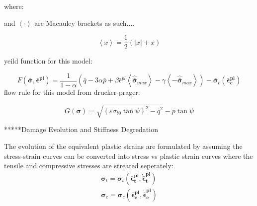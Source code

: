 where:



and $\left\langle \cdotp\right\rangle $ are Macauley brackets as
such....

\begin{equation}
\left\langle x\right\rangle =\frac{1}{2}\left(\left|x\right|+x\right)\label{eqn:const9-3}
\end{equation}


yeild function for this model:

\begin{equation}
F\left(\boldsymbol{\bar{\sigma}},\boldsymbol{\bar{\epsilon}^{pl}}\right)=\frac{1}{1-\alpha}\left(\bar{q}-3\alpha\bar{p}+\beta\bar{\epsilon}^{pl}\left\langle \hat{\boldsymbol{\bar{\sigma}}}_{max}\right\rangle -\gamma\left\langle -\hat{\boldsymbol{\bar{\sigma}}}_{max}\right\rangle \right)-\bar{\boldsymbol{\sigma}}_{c}\left(\boldsymbol{\bar{\epsilon}_{c}^{pl}}\right)\label{eqn:const10}
\end{equation}
flow rule for this model from drucker-prager:

\begin{equation}
G\left(\boldsymbol{\bar{\sigma}}\right)=\sqrt{\left(\varepsilon\sigma_{t0}\tan\psi\right)^{2}-\bar{q}^{2}}-\bar{p}\tan\psi\label{eqn:const11}
\end{equation}


{*}{*}{*}{*}{*}Damage Evolution and Stiffness Degredation

The evolution of the equivalent plastic strains are formulated by
assuming the stress-strain curves can be converted into stress vs
plastic strain curves where the tensile and compressive stresses are
streated seperately: 
\begin{equation}
\begin{aligned}\boldsymbol{\sigma}_{t}=\boldsymbol{\sigma}_{t}\left(\boldsymbol{\bar{\epsilon}_{t}^{pl}},\boldsymbol{\dot{\bar{\epsilon}}_{t}^{pl}}\right)\\
\boldsymbol{\sigma}_{c}=\boldsymbol{\sigma}_{c}\left(\boldsymbol{\bar{\epsilon}_{c}^{pl}},\boldsymbol{\dot{\bar{\epsilon}}_{c}^{pl}}\right)
\end{aligned}
\label{eqn:dam1}
\end{equation}


